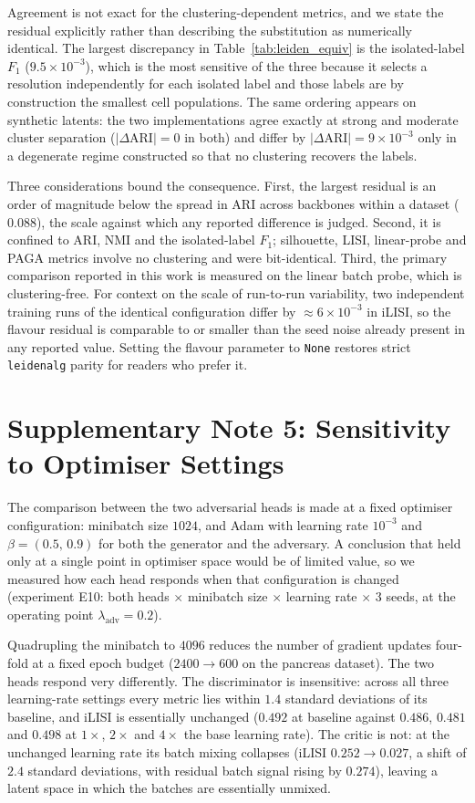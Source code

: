 \documentclass[11pt, a4paper]{article}
\begin{document}
Agreement is not exact for the clustering-dependent metrics, and we state the residual
explicitly rather than describing the substitution as numerically identical. The largest
discrepancy in Table~\ref{tab:leiden_equiv} is the isolated-label $F_1$
($9.5 \times 10^{-3}$), which is the most sensitive of the three because it selects a
resolution independently for each isolated label and those labels are by construction the
smallest cell populations. The same ordering appears on synthetic latents: the two
implementations agree exactly at strong and moderate cluster separation
($|\Delta$ARI$| = 0$ in both) and differ by $|\Delta$ARI$| = 9 \times 10^{-3}$ only in a
degenerate regime constructed so that no clustering recovers the labels.

Three considerations bound the consequence. First, the largest residual is an order of
magnitude below the spread in ARI across backbones within a dataset ($0.088$), the scale
against which any reported difference is judged. Second, it is confined to ARI, NMI and
the isolated-label $F_1$; silhouette, LISI, linear-probe and PAGA metrics involve no
clustering and were bit-identical. Third, the primary comparison reported in this work is
measured on the linear batch probe, which is clustering-free. For context on the scale of
run-to-run variability, two independent training runs of the identical configuration
differ by $\approx 6 \times 10^{-3}$ in iLISI, so the flavour residual is comparable to or
smaller than the seed noise already present in any reported value. Setting the flavour
parameter to \texttt{None} restores strict \texttt{leidenalg} parity for readers who
prefer it.

\section*{Supplementary Note 5: Sensitivity to Optimiser Settings}

The comparison between the two adversarial heads is made at a fixed optimiser
configuration: minibatch size $1024$, and Adam with learning rate $10^{-3}$ and
$\beta = (0.5,\,0.9)$ for both the generator and the adversary. A conclusion that held
only at a single point in optimiser space would be of limited value, so we measured how
each head responds when that configuration is changed (experiment E10: both heads
$\times$ minibatch size $\times$ learning rate $\times$ 3 seeds, at the operating point
$\lambda_{\mathrm{adv}} = 0.2$).

Quadrupling the minibatch to $4096$ reduces the number of gradient updates four-fold at a
fixed epoch budget ($2400 \rightarrow 600$ on the pancreas dataset). The two heads respond
very differently. The discriminator is insensitive: across all three learning-rate
settings every metric lies within $1.4$ standard deviations of its baseline, and iLISI is
essentially unchanged ($0.492$ at baseline against $0.486$, $0.481$ and $0.498$ at
$1\times$, $2\times$ and $4\times$ the base learning rate). The critic is not: at the
unchanged learning rate its batch mixing collapses (iLISI $0.252 \rightarrow 0.027$, a
shift of $2.4$ standard deviations, with residual batch signal rising by $0.274$),
leaving a latent space in which the batches are essentially unmixed.
\end{document}
